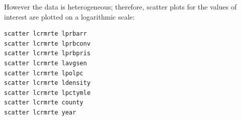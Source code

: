 \documentclass[12pt,a4paper, oneside]{extreport}
\begin{document}
However the data is heterogeneous; therefore, scatter plots for the values of interest are plotted on a logarithmic scale: 


\begin{verbatim}
scatter lcrmrte lprbarr
scatter lcrmrte lprbconv
scatter lcrmrte lprbpris
scatter lcrmrte lavgsen
scatter lcrmrte lpolpc
scatter lcrmrte ldensity
scatter lcrmrte lpctymle
scatter lcrmrte county
scatter lcrmrte year
\end{verbatim}


\begin{figure}[htb]
	\begin{minipage}[H]{0.33\linewidth}
	\end{minipage}
	\begin{minipage}[H]{0.33\linewidth}

\end{minipage}
\end{figure}
\end{document}
